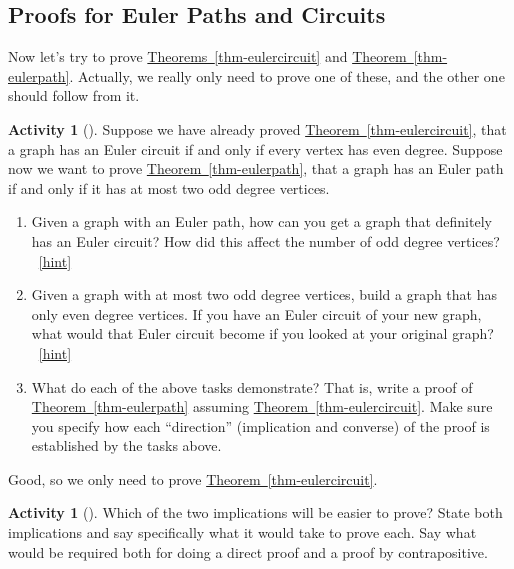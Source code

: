 \documentclass[10pt,]{book}
\theoremstyle{plain}
\theoremstyle{definition}
\theoremstyle{definition}
\theoremstyle{definition}
\newtheorem{activity}[project]{Activity}
\numberwithin{equation}{chapter}
\begin{document}
\subsection[{Proofs for Euler Paths and Circuits}]{Proofs for Euler Paths and Circuits}\label{subsection-35}
\hypertarget{p-1412}{}%
Now let's try to prove \hyperref[thm-eulercircuit]{Theorems~\ref{thm-eulercircuit}} and \hyperref[thm-eulerpath]{Theorem~\ref{thm-eulerpath}}.  Actually, we really only need to prove one of these, and the other one should follow from it.%
\begin{activity}[]\label{activity-275}
\hypertarget{p-1413}{}%
Suppose we have already proved \hyperref[thm-eulercircuit]{Theorem~\ref{thm-eulercircuit}}, that a graph has an Euler circuit if and only if every vertex has even degree.  Suppose now we want to prove \hyperref[thm-eulerpath]{Theorem~\ref{thm-eulerpath}}, that a graph has an Euler path if and only if it has at most two odd degree vertices.%
\begin{enumerate}[font=\bfseries,label=(\alph*),ref=\alph*]
\item\label{task-233} \hypertarget{p-1414}{}%
Given a graph with an Euler path, how can you get a graph that definitely has an Euler circuit?  How did this affect the number of odd degree vertices?%
~\hfill{\tiny\hyperlink{a-280.a}{[hint]}\hypertarget{q-280.a}{}}\item\label{task-234} \hypertarget{p-1419}{}%
Given a graph with at most two odd degree vertices, build a graph that has only even degree vertices.  If you have an Euler circuit of your new graph, what would that Euler circuit become if you looked at your original graph?%
~\hfill{\tiny\hyperlink{a-280.b}{[hint]}\hypertarget{q-280.b}{}}\item\label{task-235} \hypertarget{p-1423}{}%
What do each of the above tasks demonstrate?  That is, write a proof of \hyperref[thm-eulerpath]{Theorem~\ref{thm-eulerpath}} assuming \hyperref[thm-eulercircuit]{Theorem~\ref{thm-eulercircuit}}.  Make sure you specify how each ``direction'' (implication and converse) of the proof is established by the tasks above.%
\end{enumerate}
\end{activity}
\hypertarget{p-1426}{}%
Good, so we only need to prove \hyperref[thm-eulercircuit]{Theorem~\ref{thm-eulercircuit}}.%
\begin{activity}[]\label{activity-276}
\hypertarget{p-1427}{}%
Which of the two implications will be easier to prove?  State both implications and say specifically what it would take to prove each.  Say what would be required both for doing a direct proof and a proof by contrapositive.%
\end{activity}
\end{document}
